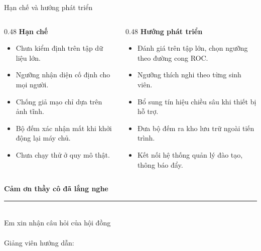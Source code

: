 \documentclass[aspectratio=169, 11pt]{beamer}
\begin{document}
\begin{frame}{Hạn chế và hướng phát triển}
  \begin{columns}[T]
    \begin{column}{0.48\textwidth}
      \textbf{\color{daumaroon} Hạn chế}
      \begin{itemize}
        \item Chưa kiểm định trên tập dữ liệu lớn.
        \item Ngưỡng nhận diện cố định cho mọi người.
        \item Chống giả mạo chỉ dựa trên ảnh tĩnh.
        \item Bộ đếm xác nhận mất khi khởi động lại máy chủ.
        \item Chưa chạy thử ở quy mô thật.
      \end{itemize}
    \end{column}
    \begin{column}{0.48\textwidth}
      \textbf{\color{agentragreen} Hướng phát triển}
      \begin{itemize}
        \item Đánh giá trên tập lớn, chọn ngưỡng theo đường cong ROC.
        \item Ngưỡng thích nghi theo từng sinh viên.
        \item Bổ sung tín hiệu chiều sâu khi thiết bị hỗ trợ.
        \item Đưa bộ đếm ra kho lưu trữ ngoài tiến trình.
        \item Kết nối hệ thống quản lý đào tạo, thông báo đẩy.
      \end{itemize}
    \end{column}
  \end{columns}
\end{frame}

\begin{frame}[plain]
  \vfill
  \begin{center}
    {\fontsize{26}{30}\selectfont\bfseries\color{daumaroon} Cảm ơn thầy cô đã lắng nghe}\\[6pt]
    {\color{daugold}\rule{6cm}{1.6pt}}\\[0.8cm]
    {\large\color{daunavy} Em xin nhận câu hỏi của hội đồng}\\[1.0cm]
    {\small\color{gray500}
     \sdTenSinhVien{} \textperiodcentered{} \sdMaSinhVien{} \textperiodcentered{}
     \sdTenLop \\[3pt]
     Giảng viên hướng dẫn: \sdTenGVHD}
  \end{center}
  \vfill
\end{frame}
\end{document}
